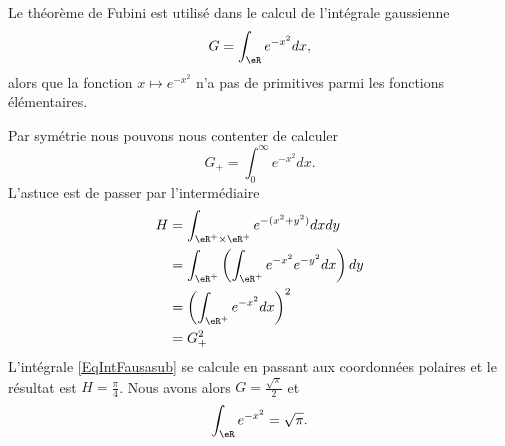 \begin{example} \label{ExrgMIni}
    Le théorème de Fubini est utilisé dans le calcul de l'intégrale gaussienne
    \begin{equation}
        G=\int_{\eR} e^{-x^2}dx,
    \end{equation}
    alors que la fonction \( x\mapsto  e^{-x^2}\) n'a pas de primitives parmi les fonctions élémentaires.

    Par symétrie nous pouvons nous contenter de calculer
    \begin{equation}
        G_+=\int_0^{\infty} e^{-x^2}dx.
    \end{equation}
    L'astuce est de passer par l'intermédiaire
    \begin{subequations}
        \begin{align}
            H&=\int_{\eR^+\times\eR^+} e^{-(x^2+y^2)}dxdy       \label{EqIntFausasub}\\
            &=\int_{\eR^+}\left( \int_{\eR^+} e^{-x^2} e^{-y^2}dx \right)dy\\
            &=\left( \int_{\eR^+} e^{-x^2} dx\right)^2\\
            &=G_+^2
        \end{align}
    \end{subequations}
    L'intégrale \eqref{EqIntFausasub} se calcule en passant aux coordonnées polaires et le résultat est \( H=\frac{ \pi }{ 4 }\). Nous avons alors \( G=\frac{ \sqrt{\pi} }{ 2 }\) et
    \begin{equation}
        \int_{\eR} e^{-x^2}=\sqrt{\pi}.
    \end{equation}
\end{example}

